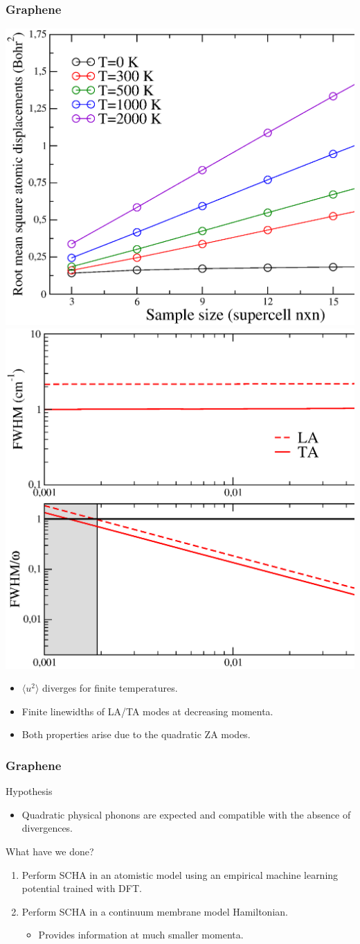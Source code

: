 \documentclass{beamer}
\begin{document}
\begin{frame}

 \frametitle{Graphene}
  \begin{center}
  \includegraphics[width=0.49\linewidth]{Pictures/Graphene/rms-harmonic.eps}
  \includegraphics[width=0.49\linewidth]{Pictures/Graphene/lw-graphene-harmonic.eps}
 \end{center}
 \begin{itemize}
  \item $\langle u^{2}\rangle$ diverges for finite temperatures.
  \item Finite linewidths of LA/TA modes at decreasing momenta.
  \item Both properties arise due to the quadratic ZA modes.
 \end{itemize}

\end{frame}


\begin{frame}

 \frametitle{Graphene}
Hypothesis
\begin{itemize}
 \item Quadratic physical phonons are expected and compatible with the absence of divergences.
\end{itemize}
What have we done?
\begin{enumerate}
 \item Perform SCHA in an atomistic model using an empirical machine learning potential trained with DFT.
 \item Perform SCHA in a continuum membrane model Hamiltonian.
 \begin{itemize}
 \item Provides information at much smaller momenta.
 \end{itemize}
\end{enumerate}

\end{frame}
\end{document}
